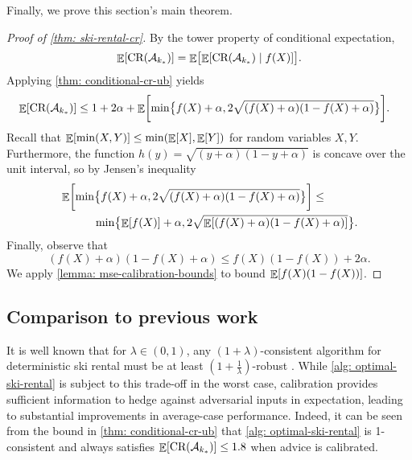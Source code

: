 Finally, we prove this section's main theorem.
\begin{proof}[Proof of \cref{thm: ski-rental-cr}]
By the tower property of conditional expectation, \[\mathop{\mathbb{E}}[\textnormal{CR}(\mathcal{A}_{k_*})] = \mathop{\mathbb{E}}\bigl[\mathop{\mathbb{E}}[\textnormal{CR}(\mathcal{A}_{k_*}) \mid f(X) ]\bigr].\] Applying \cref{thm: conditional-cr-ub} yields
\begin{align*}
    &\mathop{\mathbb{E}}[\textnormal{CR}(\mathcal{A}_{k_*})]  \leq 1+2\alpha
    +\mathop{\mathbb{E}}\biggl[\min\bigl\{f(X)+\alpha, 2\sqrt{(f(X)+\alpha)(1-f(X)+\alpha)} \bigr\}\biggr].
\end{align*}
Recall that $\mathop{\mathbb{E}}[\min(X, Y)] \leq \min(\mathop{\mathbb{E}}[X], \mathop{\mathbb{E}}[Y])$ for random variables $X, Y$. Furthermore, the function $h(y) = \sqrt{(y+\alpha)(1-y+\alpha)}$ is concave over the unit interval, so by Jensen's inequality
\begin{align*}
    &\mathop{\mathbb{E}}\biggl[\min\bigl\{f(X)+\alpha, 2\sqrt{(f(X)+\alpha)(1-f(X)+\alpha)} \bigr\}\biggr]\leq \\ &\quad\quad\quad \min\bigl\{\mathop{\mathbb{E}}[f(X)]+\alpha, 2\sqrt{\mathop{\mathbb{E}}[(f(X)+\alpha)(1-f(X)+\alpha)]} \bigr\}.
\end{align*}
Finally, observe that
\[(f(X)+\alpha)(1-f(X)+\alpha) \leq f(X)(1-f(X)) + 2\alpha.\]
We apply \cref{lemma: mse-calibration-bounds} to bound $\mathop{\mathbb{E}}[f(X)(1-f(X))]$.
\end{proof}

\subsection{Comparison to previous work} 
It is well known that for $\lambda \in (0,1)$, any $(1+\lambda)$-consistent algorithm for deterministic ski rental must be at least $(1+\frac{1}{\lambda})$-robust 
\citep{Wei20:Optimal,Angelopoulos20:Online,Gollapudi19:Online}. While \cref{alg: optimal-ski-rental} is subject to this trade-off in the worst case, calibration provides sufficient information to hedge against adversarial inputs in expectation, leading to substantial improvements in average-case performance. Indeed, it can be seen from the bound in \cref{thm: conditional-cr-ub} that \cref{alg: optimal-ski-rental} is 1-consistent and always satisfies $\mathop{\mathbb{E}}[\textnormal{CR}(\mathcal{A}_{k_*})] \leq 1.8$ when advice is calibrated.

